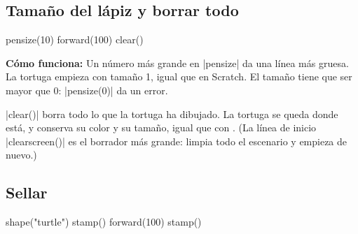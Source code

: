 \subsection*{Tamaño del lápiz y borrar todo}

\begin{tcbraster}[raster columns=2, raster equal height=rows, raster column skip=12pt, raster valign=center]
\begin{tcolorbox}[colback=white, colframe=white, boxrule=0pt, valign=center]
\begin{scratch}
\end{scratch}
\end{tcolorbox}
\begin{code}
pensize(10)
forward(100)
clear()
\end{code}
\end{tcbraster}

\textbf{Cómo funciona:} Un número más grande en \py|pensize| da una línea más gruesa. La tortuga empieza con tamaño 1, igual que en Scratch. El tamaño tiene que ser mayor que 0: \py|pensize(0)| da un error.

\py|clear()| borra todo lo que la tortuga ha dibujado. La tortuga se queda donde está, y conserva su color y su tamaño, igual que con . (La línea de inicio \py|clearscreen()| es el borrador más grande: limpia todo el escenario y empieza de nuevo.)

\subsection*{Sellar}

\begin{tcbraster}[raster columns=2, raster equal height=rows, raster column skip=12pt, raster valign=center]
\begin{tcolorbox}[colback=white, colframe=white, boxrule=0pt, valign=center]
\begin{scratch}
\end{scratch}
\end{tcolorbox}
\begin{code}
shape("turtle")
stamp()
forward(100)
stamp()
\end{code}
\end{tcbraster}

